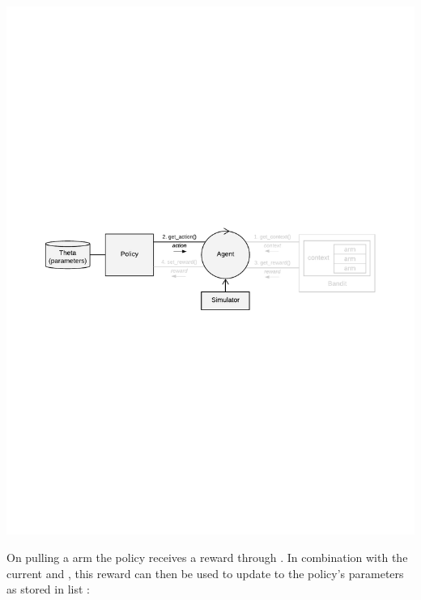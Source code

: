 \documentclass{jss}
\begin{document}
\includegraphics[width=\textwidth]{fig/all_cmab_phases_Part4}

On pulling a  arm the policy receives a  reward through . In combination with the current  and , this reward can then be used to update to the policy's parameters as stored in list :
\end{document}
